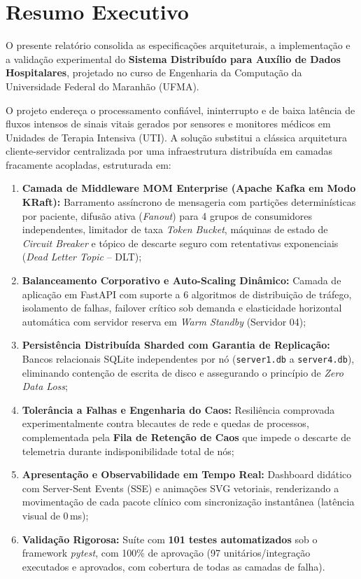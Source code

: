 \documentclass[12pt,a4paper]{article}
\begin{document}
\newpage
\tableofcontents
\newpage

\section*{Resumo Executivo}

O presente relatório consolida as especificações arquiteturais, a implementação e a validação experimental do \textbf{Sistema Distribuído para Auxílio de Dados Hospitalares}, projetado no curso de Engenharia da Computação da Universidade Federal do Maranhão (UFMA). 

O projeto endereça o processamento confiável, ininterrupto e de baixa latência de fluxos intensos de sinais vitais gerados por sensores e monitores médicos em Unidades de Terapia Intensiva (UTI). A solução substitui a clássica arquitetura cliente-servidor centralizada por uma infraestrutura distribuída em camadas fracamente acopladas, estruturada em:
\begin{enumerate}
	\item \textbf{Camada de Middleware MOM Enterprise (Apache Kafka em Modo KRaft):} Barramento assíncrono de mensageria com partições determinísticas por paciente, difusão ativa (\textit{Fanout}) para 4 grupos de consumidores independentes, limitador de taxa \textit{Token Bucket}, máquinas de estado de \textit{Circuit Breaker} e tópico de descarte seguro com retentativas exponenciais (\textit{Dead Letter Topic} -- DLT);
	\item \textbf{Balanceamento Corporativo e Auto-Scaling Dinâmico:} Camada de aplicação em FastAPI com suporte a 6 algoritmos de distribuição de tráfego, isolamento de falhas, failover crítico sob demanda e elasticidade horizontal automática com servidor reserva em \textit{Warm Standby} (Servidor 04);
	\item \textbf{Persistência Distribuída Sharded com Garantia de Replicação:} Bancos relacionais SQLite independentes por nó (\texttt{server1.db} a \texttt{server4.db}), eliminando contenção de escrita de disco e assegurando o princípio de \textit{Zero Data Loss};
	\item \textbf{Tolerância a Falhas e Engenharia do Caos:} Resiliência comprovada experimentalmente contra blecautes de rede e quedas de processos, complementada pela \textbf{Fila de Retenção de Caos} que impede o descarte de telemetria durante indisponibilidade total de nós;
	\item \textbf{Apresentação e Observabilidade em Tempo Real:} Dashboard didático com Server-Sent Events (SSE) e animações SVG vetoriais, renderizando a movimentação de cada pacote clínico com sincronização instantânea (latência visual de 0\,ms);
	\item \textbf{Validação Rigorosa:} Suíte com \textbf{101 testes automatizados} sob o framework \textit{pytest}, com 100\% de aprovação (97 unitários/integração executados e aprovados, com cobertura de todas as camadas de falha).
\end{enumerate}
\end{document}
